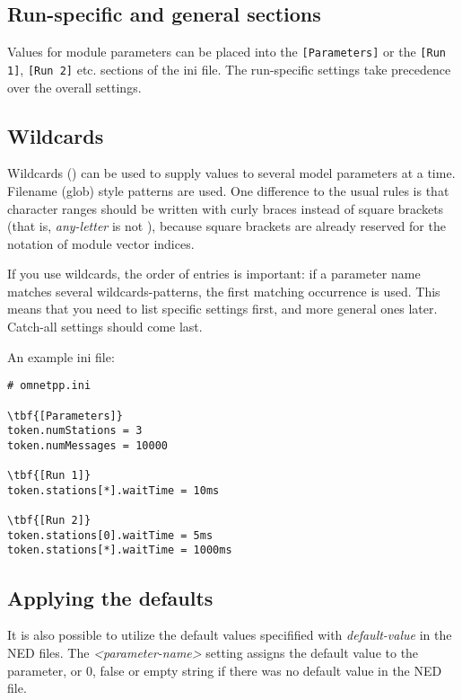 \subsection{Run-specific and general sections}

Values for module parameters can be placed into the \texttt{[Parameters]}
or the \texttt{[Run 1]}, \texttt{[Run 2]} etc. sections of the ini file.
The run-specific settings take precedence over the overall settings.

\subsection{Wildcards}

Wildcards () can be used to supply values
to several model parameters at a time. Filename (glob) style patterns
are used. One difference to the usual rules is that character ranges
should be written with curly braces instead of square brackets (that is,
\textit{any-letter} is  not \ttt{[a-zA-Z]}), because
square brackets are already reserved for the notation of module vector indices.

If you use wildcards, the order of entries is important: if a parameter
name matches several wildcards-patterns, the first matching occurrence
is used. This means that you need to list specific settings first, and
more general ones later. Catch-all settings should come last.


An example ini file:

\begin{Verbatim}[commandchars=\\\{\}]
# omnetpp.ini

\tbf{[Parameters]}
token.numStations = 3
token.numMessages = 10000

\tbf{[Run 1]}
token.stations[*].waitTime = 10ms

\tbf{[Run 2]}
token.stations[0].waitTime = 5ms
token.stations[*].waitTime = 1000ms
\end{Verbatim}


\subsection{Applying the defaults}

It is also possible to utilize the default values specifified with
\textit{default-value}\ttt{)} in the NED files.{\new}
The \textit{<parameter-name>} setting assigns
the default value to the parameter, or 0, false or empty string if
there was no default value in the NED file.

